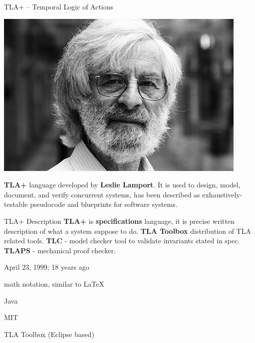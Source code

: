 \documentclass[12pt]{beamer}
\begin{document}
  \begin{frame}{TLA+ -- Temporal Logic of Actions}
      \begin{center}
          \includegraphics[scale=0.3]{figures/lamport.jpg}
      \end{center}
      \textbf{TLA+} language developed by \textbf{Leslie Lamport}. It is
      used to design, model, document, and verify concurrent systems, has
      been described as exhaustively-testable pseudocode and blueprints
      for software systems.
  \end{frame}
  \begin{frame}{TLA+ Description}
      \textbf{TLA+} is \textbf{specifications} language, it is precise written
      description of what a system suppose to do. \textbf{TLA Toolbox}
      distribution of TLA related tools. \textbf{TLC} - model checker
      tool to validate invariants stated in spec. \textbf{TLAPS} - mechanical
      proof checker.

      \begin{description}[align=right]
        \item [Released] April 23, 1999; 18 years ago
        \item [Syntax] math notation, similar to \LaTeX
        \item [Implem.] Java
        \item [License] MIT
        \item [IDE] TLA Toolbox (Eclipse based) \cite{azurewebsites}
      \end{description}
  \end{frame}
\end{document}
